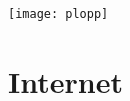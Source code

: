  \begin{center}
   \texttt{[image: plopp]}\\
   \stPloppDrawingSessionTerm
 \end{center}

\begin{stGlossary}
\end{stGlossary}

\pagebreak{}

\section{\stBooksTerm}

\stBooksDefinition

\section{\stSmalltalkActionsTerm}

\stSmalltalkActionsDefinition

\section{Internet}

\stInternetWebsitesDefinition

